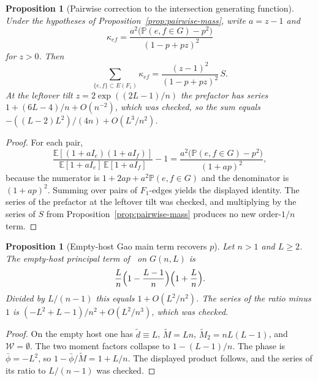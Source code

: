 \documentclass[11pt]{article}
\newtheorem{proposition}[theorem]{Proposition}
\newcommand{\EE}{\mathbb{E}}
\newcommand{\PP}{\mathbb{P}}
\begin{document}
\begin{proposition}[Pairwise correction to the intersection generating function]
\label{prop:pairwise-pgf}
Under the hypotheses of Proposition~\ref{prop:pairwise-mass}, write \(a=z-1\) and
\[
\kappa_{ef}=\frac{a^2\bigl(\PP(e,f\in G)-p^2\bigr)}{(1-p+pz)^2}
\]
for \(z>0\). Then
\[
\sum_{\{e,f\}\subset E(F_1)}\kappa_{ef}
=
\frac{(z-1)^2}{(1-p+pz)^2}\,S.
\]
At the leftover tilt \(z=2\exp((2L-1)/n)\) the prefactor has series \(1+(6L-4)/n+O(n^{-2})\), which was checked, so the sum equals \(-((L-2)L^2)/(4n)+O(L^3/n^2)\).
\end{proposition}

\begin{proof}
For each pair,
\[
\frac{\EE[(1+aI_e)(1+aI_f)]}{\EE[1+aI_e]\,\EE[1+aI_f]}-1
=
\frac{a^2\bigl(\PP(e,f\in G)-p^2\bigr)}{(1+ap)^2},
\]
because the numerator is \(1+2ap+a^2\PP(e,f\in G)\) and the denominator is \((1+ap)^2\).
Summing over pairs of \(F_1\)-edges yields the displayed identity.
The series of the prefactor at the leftover tilt was checked, and multiplying by the series of \(S\) from Proposition~\ref{prop:pairwise-mass} produces no new order-\(1/n\) term.
\end{proof}

\begin{proposition}[Empty-host Gao main term recovers \(p\)]
\label{prop:gao-empty-p}
Let \(n>1\) and \(L\ge 2\). The empty-host principal term of~\cite[Theorem~6]{Gao20} on \(G(n,L)\) is
\[
\frac{L}{n}\Bigl(1-\frac{L-1}{n}\Bigr)\Bigl(1+\frac{L}{n}\Bigr).
\]
Divided by \(L/(n-1)\) this equals \(1+O(L^2/n^2)\). The series of the ratio minus \(1\) is \((-L^2+L-1)/n^2+O(L^2/n^3)\), which was checked.
\end{proposition}

\begin{proof}
On the empty host one has \(\widetilde d\equiv L\), \(\widetilde M=Ln\), \(\widetilde M_2=nL(L-1)\), and \(\mathcal W=\emptyset\).
The two moment factors collapse to \(1-(L-1)/n\).
The phase is \(\bar\phi=-L^2\), so \(1-\bar\phi/\widetilde M=1+L/n\).
The displayed product follows, and the series of its ratio to \(L/(n-1)\) was checked.
\end{proof}
\end{document}
